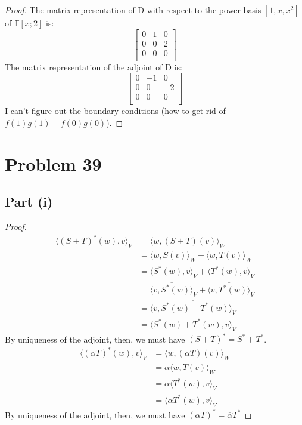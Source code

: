 \documentclass{article}
\begin{document}
\begin{proof}
The matrix representation of D with respect to the power basis $[1, x, x^2]$ of $\mathbb{F}[x; 2]$ is:
$$\begin{bmatrix}
0 & 1 & 0 \\
0 & 0 & 2 \\
0 & 0 & 0 \\
\end{bmatrix}$$
The matrix representation of the adjoint of D is:
$$\begin{bmatrix}
0 & -1 & 0 \\
0 & 0 & -2 \\
0 & 0 & 0 \\
\end{bmatrix}$$
I can't figure out the boundary conditions (how to get rid of $f(1)g(1) - f(0)g(0)$).
\end{proof}

\section*{Problem 39}

\subsection*{Part (i)}

\begin{proof}
\begin{align*}
\langle (S + T)^{*}(w), v \rangle_V &= \langle w, (S + T)(v) \rangle_W \\
&= \langle w, S(v) \rangle_W + \langle w, T(v) \rangle_W \\
&= \langle S^{*}(w), v \rangle_V + \langle T^{*}(w), v \rangle_V \\
&= \overline{\langle v , S^{*}(w) \rangle}_V + \overline{\langle v , T^{*}(w) \rangle}_V \\
&= \overline{\langle v , S^{*}(w) + T^{*}(w) \rangle_V} \\
&= \langle S^{*}(w) + T^{*}(w), v \rangle_V
\end{align*}
By uniqueness of the adjoint, then, we must have $(S + T)^{*} = S^{*} + T^{*}$.
\begin{align*}
\langle (\alpha T)^{*}(w), v \rangle_V &= \langle w, (\alpha T)(v) \rangle_W \\
&= \alpha \langle w, T(v) \rangle_W \\
&= \alpha \langle T^{*}(w), v \rangle_V \\
&= \langle \overline{\alpha} T^{*}(w), v \rangle_V
\end{align*}
By uniqueness of the adjoint, then, we must have $(\alpha T)^{*} = \overline{\alpha} T^{*}$
\end{proof}
\end{document}
